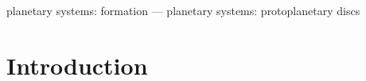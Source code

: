 \documentclass[useAMS,usenatbib]{mn2e}
\begin{document}
\begin{keywords}
  planetary systems: formation --- planetary systems:
  protoplanetary discs
\end{keywords}


\section{Introduction}\label{intro}






%





\appendix

%
\end{document}
